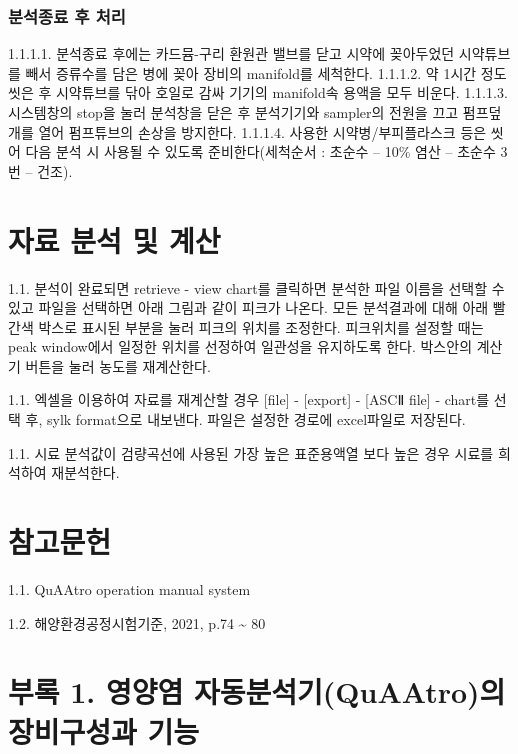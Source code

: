 \documentclass[
]{book}
\begin{document}
\hypertarget{uxbd84uxc11duxc885uxb8cc-uxd6c4-uxcc98uxb9ac}{%
\subsubsection{분석종료 후 처리}\label{uxbd84uxc11duxc885uxb8cc-uxd6c4-uxcc98uxb9ac}}

1.1.1.1. 분석종료 후에는 카드뮴-구리 환원관 밸브를 닫고 시약에 꽂아두었던 시약튜브를 빼서 증류수를 담은 병에 꽂아 장비의 manifold를 세척한다.
1.1.1.2. 약 1시간 정도 씻은 후 시약튜브를 닦아 호일로 감싸 기기의 manifold속 용액을 모두 비운다.
1.1.1.3. 시스템창의 stop을 눌러 분석창을 닫은 후 분석기기와 sampler의 전원을 끄고 펌프덮개를 열어 펌프튜브의 손상을 방지한다.
1.1.1.4. 사용한 시약병/부피플라스크 등은 씻어 다음 분석 시 사용될 수 있도록 준비한다(세척순서 : 초순수 -- 10\% 염산 -- 초순수 3번 -- 건조).

\hypertarget{uxc790uxb8cc-uxbd84uxc11d-uxbc0f-uxacc4uxc0b0}{%
\section{자료 분석 및 계산}\label{uxc790uxb8cc-uxbd84uxc11d-uxbc0f-uxacc4uxc0b0}}

1.1. 분석이 완료되면 retrieve - view chart를 클릭하면 분석한 파일 이름을 선택할 수 있고 파일을 선택하면 아래 그림과 같이 피크가 나온다. 모든 분석결과에 대해 아래 빨간색 박스로 표시된 부분을 눌러 피크의 위치를 조정한다. 피크위치를 설정할 때는 peak window에서 일정한 위치를 선정하여 일관성을 유지하도록 한다. 박스안의 계산기 버튼을 눌러 농도를 재계산한다.

1.1. 엑셀을 이용하여 자료를 재계산할 경우 {[}file{]} - {[}export{]} - {[}ASCⅡ file{]} - chart를 선택 후, sylk format으로 내보낸다. 파일은 설정한 경로에 excel파일로 저장된다.

1.1. 시료 분석값이 검량곡선에 사용된 가장 높은 표준용액열 보다 높은 경우 시료를 희석하여 재분석한다.

\hypertarget{uxcc38uxace0uxbb38uxd5cc-1}{%
\section{참고문헌}\label{uxcc38uxace0uxbb38uxd5cc-1}}

1.1. QuAAtro operation manual system

1.2. 해양환경공정시험기준, 2021, p.74 \textasciitilde{} 80

\hypertarget{uxbd80uxb85d-1.-uxc601uxc591uxc5fc-uxc790uxb3d9uxbd84uxc11duxae30quaatrouxc758-uxc7a5uxbe44uxad6cuxc131uxacfc-uxae30uxb2a5}{%
\section{부록 1. 영양염 자동분석기(QuAAtro)의 장비구성과 기능}\label{uxbd80uxb85d-1.-uxc601uxc591uxc5fc-uxc790uxb3d9uxbd84uxc11duxae30quaatrouxc758-uxc7a5uxbe44uxad6cuxc131uxacfc-uxae30uxb2a5}}
\end{document}
